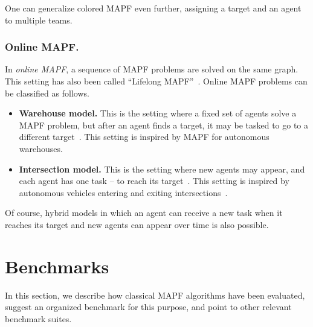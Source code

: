 \documentclass[letterpaper]{article} %
\newcommand{\mapf}{\ac{MAPF}\xspace}
\begin{document}
One can generalize colored \mapf even further, assigning a target and an agent to multiple teams.


\subsubsection{Online MAPF.}
In \emph{online \mapf}, a sequence of \mapf problems are solved on the same graph. This setting has also been called ``Lifelong MAPF''~\cite{MaAAMAS17,MaAAAI19b}. Online \mapf problems can be classified as follows.
\begin{itemize}
    \item \textbf{Warehouse model.} This is the setting where a fixed set of agents solve a \mapf problem, but after an agent finds a target, it may be tasked to go to a different target~\cite{MaAAAI19b}. This setting is inspired by \mapf for autonomous warehouses.
    \item \textbf{Intersection model.} This is the setting where new agents may appear, and each agent has one task -- to reach its target~\cite{svancara2019online}. This setting is inspired by autonomous vehicles entering and exiting intersections~\cite{dresner2008multiagent}.
\end{itemize}
Of course, hybrid models in which an agent can receive a new task when it reaches its target and new agents can appear over time is also possible.

\section{Benchmarks}

In this section, we describe how classical \mapf algorithms have been evaluated, suggest an organized benchmark for this purpose, and point to other relevant benchmark suites.

\end{document}
